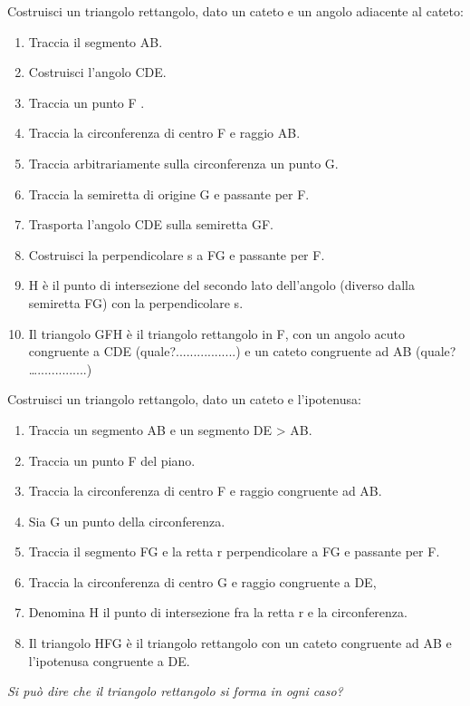 \begin{procedura}
	Costruisci un triangolo rettangolo, dato un cateto e un angolo adiacente al cateto:
	\begin{enumerate} [nosep]
		\item 
		Traccia il segmento AB.
		\item 
		Costruisci l'angolo CDE.
		\item 
		Traccia un punto F .
		\item 
		Traccia la circonferenza di centro F e raggio AB.
		\item 
		Traccia arbitrariamente sulla circonferenza un punto G.
		\item 
		Traccia la semiretta di origine G e passante per F.
		\item 
		Trasporta l'angolo CDE sulla semiretta GF.
		\item 
		Costruisci la perpendicolare s a FG e passante per F.
		\item 
		H è il punto di intersezione del secondo lato dell'angolo (diverso dalla semiretta FG) con la perpendicolare s.
		\item 
		Il triangolo GFH è il triangolo rettangolo in F, con un angolo acuto congruente a CDE (quale?.................) e un cateto congruente ad AB (quale? …..............)
	\end{enumerate}
\end{procedura}

\begin{procedura}
	Costruisci un triangolo rettangolo, dato un cateto e l'ipotenusa:
	\begin{enumerate} [nosep]
		\item 
		Traccia un segmento AB e un segmento DE > AB.
		\item 
		Traccia un punto F del piano.
		\item 
		Traccia la circonferenza di centro F e raggio congruente ad AB.
		\item 
		Sia G un punto della circonferenza.
		\item 
		Traccia il segmento FG e la retta r perpendicolare a FG e passante per F.
		\item 
		Traccia la circonferenza di centro G e raggio congruente a DE,
		\item 
		Denomina H il punto di intersezione fra la retta r e la circonferenza.
		\item 
		Il triangolo HFG è il triangolo rettangolo con un cateto congruente ad AB e l'ipotenusa congruente a DE.
	\end{enumerate}
	\textsl{Si può dire che il triangolo rettangolo si forma in ogni caso?}
\end{procedura}

